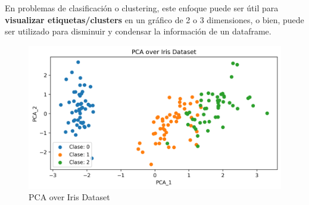 En problemas de clasificación o clustering, este enfoque puede ser útil para \textbf{visualizar etiquetas/clusters} en un gráfico de 2 o 3 dimensiones, o bien, puede ser utilizado para disminuir y condensar la información de un dataframe. 
\begin{figure}[H]
    \center
    \includegraphics[scale=0.6]{notebooks/ML/img/pca_over_iris.png}
    \caption{PCA over Iris Dataset}
\end{figure}






